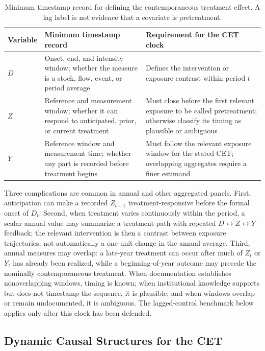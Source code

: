 \documentclass[
]{article}
\begin{document}
\begin{table}[!h]
\centering
\caption{\label{tab:minimum-timestamp-table}Minimum timestamp record for defining the contemporaneous treatment effect. A lag label is not evidence that a covariate is pretreatment. \label{tab:min_timestamp}}
\centering
\fontsize{9}{11}\selectfont
\begin{tabular}[t]{>{\raggedright\arraybackslash}p{0.45in}>{\raggedright\arraybackslash}p{2.35in}>{\raggedright\arraybackslash}p{2.85in}}
\toprule
Variable & Minimum timestamp record & Requirement for the CET clock\\
\midrule
$D$ & Onset, end, and intensity window; whether the measure is a stock, flow, event, or period average & Defines the intervention or exposure contrast within period $t$\\
$Z$ & Reference and measurement window; whether it can respond to anticipated, prior, or current treatment & Must close before the first relevant exposure to be called pretreatment; otherwise classify its timing as plausible or ambiguous\\
$Y$ & Reference window and measurement time; whether any part is recorded before treatment begins & Must follow the relevant exposure window for the stated CET; overlapping aggregates require a finer estimand\\
\bottomrule
\end{tabular}
\end{table}

Three complications are common in annual and other aggregated panels.
First, anticipation can make a recorded \(Z_{t-1}\) treatment-responsive
before the formal onset of \(D_t\). Second, when treatment varies
continuously within the period, a scalar annual value may summarize a
treatment path with repeated \(D\leftrightarrow Z\leftrightarrow Y\)
feedback; the relevant intervention is then a contrast between exposure
trajectories, not automatically a one-unit change in the annual average.
Third, annual measures may overlap: a late-year treatment can occur
after much of \(Z_t\) or \(Y_t\) has already been realized, while a
beginning-of-year outcome may precede the nominally contemporaneous
treatment. When documentation establishes nonoverlapping windows, timing
is known; when institutional knowledge supports but does not timestamp
the sequence, it is plausible; and when windows overlap or remain
undocumented, it is ambiguous. The lagged-control benchmark below
applies only after this clock has been defended.

\subsection{Dynamic Causal Structures for the
CET}\label{dynamic-causal-structures-for-the-cet}
\end{document}
